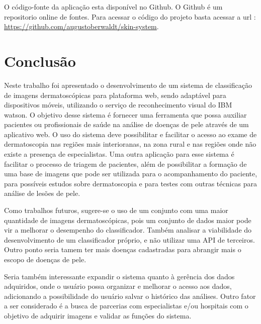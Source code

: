 \documentclass[openright]{ifrs} %
\begin{document}
 O código-fonte da  aplicação esta  disponível 
 no Github. O Github é um repositorio online de fontes. Para acessar o código do projeto  basta acessar a url : \url{https://github.com/augustoberwaldt/skin-system}.


\chapter{Conclusão}

Neste trabalho foi apresentado o desenvolvimento de um sistema de classificação de imagens dermatoscópicas para plataforma web, sendo adaptável para dispositivos móveis, utilizando o serviço de reconhecimento visual do IBM watson. O objetivo desse sistema é fornecer uma ferramenta que possa auxiliar pacientes ou  profissionais de saúde na análise de doenças de pele através de um aplicativo web. O uso do sistema deve possibilitar e facilitar o acesso ao exame de dermatoscopia nas regiões mais interioranas, na zona rural e nas regiões onde não existe a presença de especialistas. Uma outra aplicação para esse sistema é facilitar o processo de triagem de pacientes, além de possibilitar a formação de uma base de imagens que pode ser utilizada para o acompanhamento do paciente, para possíveis estudos sobre dermatoscopia e para testes com outras técnicas para análise de lesões de pele.

Como trabalhos futuros, sugere-se o uso de um conjunto com uma maior quantidade de imagens dermatoscópicas, pois um conjunto de dados maior pode vir a melhorar o desempenho do classificador. Também analisar a viabilidade do desenvolvimento de um classificador próprio, e não utilizar uma API de terceiros. Outro ponto seria tamem ter mais doenças cadastradas para abrangir
mais o escopo de doenças de pele.

Seria também interessante expandir o sistema quanto à gerência dos dados adquiridos, onde o usuário possa organizar e melhorar o acesso aos dados, adicionando a possibilidade do usuário salvar o histórico das análises. Outro fator a ser considerado é a busca de parcerias com especialistas e/ou hospitais com o objetivo de adquirir imagens e validar as funções do sistema.










\appendix
\end{document}
